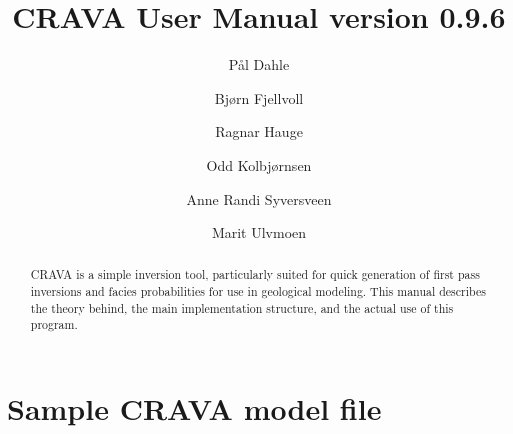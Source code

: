 \documentclass[screen,note,long,backref,indentpar]{nrdoc}
\title{CRAVA User Manual version 0.9.6}
\author{P{\aa}l Dahle\and Bj{\o}rn Fjellvoll\and Ragnar Hauge\and Odd Kolbj{\o}rnsen\and Anne Randi Syversveen\and Marit Ulvmoen }
\newcommand{\crava} {\textsf{CRAVA}\xspace}
\begin{document}
\maketitle

\begin{abstract}
CRAVA is a simple inversion tool, particularly suited for quick generation of first pass inversions and facies probabilities for use in geological modeling. This manual describes the theory behind, the main implementation structure, and the actual use of this program.
\end{abstract}

\tableofcontents
\clearemptydoublepage



\newpage

\newpage

\newpage



\appendix


\chapter{Sample \crava model file}
\label{sec:crava-model-file}

\vspace{-2em}
\end{document}
